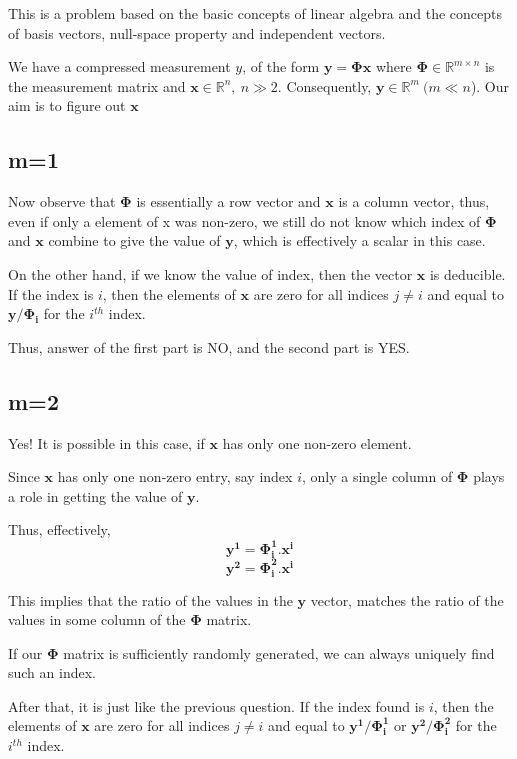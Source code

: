 \documentclass[a4paper,11pt]{article}
\numberwithin{definition}{section}
\numberwithin{mytheorem}{subsection}
\begin{document}
This is a problem based on the basic concepts of linear algebra and the concepts of basis vectors, null-space property and independent vectors.

We have a compressed measurement $y$, of the form $\mathbf{y} = \mathbf{\Phi x}$ where $\mathbf{\Phi} \in \mathbb{R}^{m \times n}$ is the measurement matrix and $\mathbf{x} \in \mathbb{R}^n, ~n \gg 2$. Consequently, $\mathbf{y} \in \mathbb{R}^m ~(m \ll n$). Our aim is to figure out $\mathbf{x}$

\subsection{m=1}
Now observe that $\mathbf{\Phi}$ is essentially a row vector and $\mathbf{x}$ is a column vector, thus, even if only a element of x was non-zero, we still do not know which index of $\mathbf{\Phi}$ and $\mathbf{x}$ combine to give the value of $\mathbf{y}$, which is effectively a scalar in this case.

On the other hand, if we know the value of index, then the vector $\mathbf{x}$ is deducible. If the index is $i$, then the elements of $\mathbf{x}$ are zero for all indices $j\neq i$ and equal to $\mathbf{y/\Phi_i}$ for the $i^{th}$ index.

Thus, answer of the first part is NO, and the second part is YES.

\subsection{m=2}

Yes! It is possible in this case, if $\mathbf{x}$ has only one non-zero element.

Since $\mathbf{x}$ has only one non-zero entry, say index $i$, only a single column of $\mathbf{\Phi}$ plays a role in getting the value of $\mathbf{y}$.

Thus, effectively,
$$\mathbf{y^1} = \mathbf{\Phi_i^1.x^i}$$
$$\mathbf{y^2} = \mathbf{\Phi_i^2.x^i}$$

This implies that the ratio of the values in the $\mathbf{y}$ vector, matches the ratio of the values in some column of the $\mathbf{\Phi}$ matrix.

If our $\mathbf{\Phi}$ matrix is sufficiently randomly generated, we can always uniquely find such an index.

After that, it is just like the previous question. If the index found is $i$, then the elements of $\mathbf{x}$ are zero for all indices $j\neq i$ and equal to $\mathbf{y^1/\Phi_i^1}$ or $\mathbf{y^2/\Phi_i^2}$ for the $i^{th}$ index.
\end{document}
